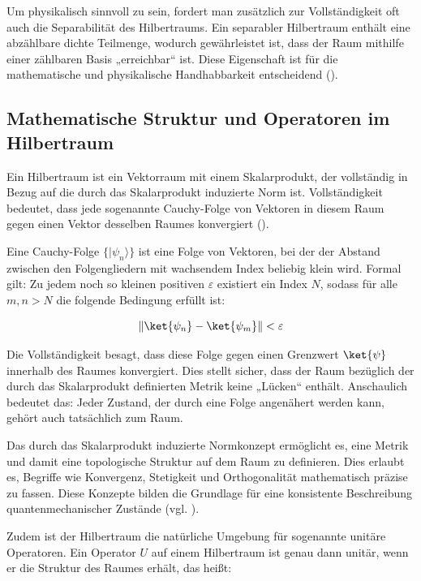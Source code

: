 Um physikalisch sinnvoll zu sein, fordert man zusätzlich zur Vollständigkeit oft auch die Separabilität des Hilbertraums. Ein separabler Hilbertraum enthält eine abzählbare dichte Teilmenge, wodurch gewährleistet ist, dass der Raum mithilfe einer zählbaren Basis „erreichbar“ ist. Diese Eigenschaft ist für die mathematische und physikalische Handhabbarkeit entscheidend (\cite[Kap. 2] {nolting_springer_2013}). 

\subsection{Mathematische Struktur und Operatoren im Hilbertraum}
\label{subsec:Mathematische Struktur und Operatoren im Hilbertraum}

Ein Hilbertraum ist ein Vektorraum mit einem Skalarprodukt, der vollständig in Bezug auf die durch das Skalarprodukt induzierte Norm ist. Vollständigkeit bedeutet, dass jede sogenannte Cauchy-Folge von Vektoren in diesem Raum gegen einen Vektor desselben Raumes konvergiert (\cite[Kap.2]{nolting_springer_2013}).

Eine Cauchy-Folge \( \{ |\psi_n\rangle \} \) ist eine Folge von Vektoren, bei der der Abstand zwischen den Folgengliedern mit wachsendem Index beliebig klein wird. Formal gilt: Zu jedem noch so kleinen positiven \( \varepsilon \) existiert ein Index \( N \), sodass für alle \( m,n > N \) die folgende Bedingung erfüllt ist:

\[
\| \ket{\psi_n}  - \ket{\psi_m}  \| < \varepsilon
\]

Die Vollständigkeit besagt, dass diese Folge gegen einen Grenzwert \( \ket{\psi} \) innerhalb des Raumes konvergiert. Dies stellt sicher, dass der Raum bezüglich der durch das Skalarprodukt definierten Metrik keine „Lücken“ enthält. Anschaulich bedeutet das: Jeder Zustand, der durch eine Folge angenähert werden kann, gehört auch tatsächlich zum Raum.

Das durch das Skalarprodukt induzierte Normkonzept ermöglicht es, eine Metrik und damit eine topologische Struktur auf dem Raum zu definieren. Dies erlaubt es, Begriffe wie Konvergenz, Stetigkeit und Orthogonalität mathematisch präzise zu fassen. Diese Konzepte bilden die Grundlage für eine konsistente Beschreibung quantenmechanischer Zustände (vgl. \cite[Kapitel V]{werner_funktionalanalysis_2002}).

Zudem ist der Hilbertraum die natürliche Umgebung für sogenannte unitäre Operatoren. Ein Operator \( U \) auf einem Hilbertraum ist genau dann unitär, wenn er die Struktur des Raumes erhält, das heißt:

